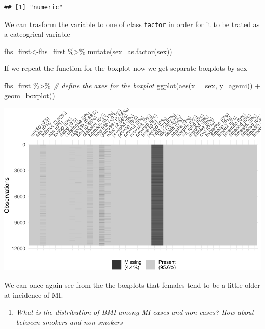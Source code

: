 \documentclass[
]{book}
\newenvironment{Shaded}{\begin{snugshade}}{\end{snugshade}}
\newcommand{\AttributeTok}[1]{\textcolor[rgb]{0.77,0.63,0.00}{#1}}
\newcommand{\CommentTok}[1]{\textcolor[rgb]{0.56,0.35,0.01}{\textit{#1}}}
\newcommand{\FunctionTok}[1]{\textcolor[rgb]{0.00,0.00,0.00}{#1}}
\newcommand{\NormalTok}[1]{#1}
\newcommand{\OtherTok}[1]{\textcolor[rgb]{0.56,0.35,0.01}{#1}}
\newcommand{\SpecialCharTok}[1]{\textcolor[rgb]{0.00,0.00,0.00}{#1}}
\providecommand{\tightlist}{%
  \setlength{\itemsep}{0pt}\setlength{\parskip}{0pt}}
\begin{document}
\begin{verbatim}
## [1] "numeric"
\end{verbatim}

We can trasform the variable to one of class \texttt{factor} in order for it to be trated as a cateogrical variable

\begin{Shaded}
\begin{Highlighting}[]
\NormalTok{fhs\_first}\OtherTok{\textless{}{-}}\NormalTok{fhs\_first }\SpecialCharTok{\%\textgreater{}\%} 
\FunctionTok{mutate}\NormalTok{(}\AttributeTok{sex=}\FunctionTok{as.factor}\NormalTok{(sex))}
\end{Highlighting}
\end{Shaded}

If we repeat the function for the boxplot now we get separate boxplots by sex

\begin{Shaded}
\begin{Highlighting}[]
\NormalTok{fhs\_first }\SpecialCharTok{\%\textgreater{}\%} 
  \CommentTok{\# define the axes for the boxplot}
  \FunctionTok{ggplot}\NormalTok{(}\FunctionTok{aes}\NormalTok{(}\AttributeTok{x =}\NormalTok{ sex, }\AttributeTok{y=}\NormalTok{agemi)) }\SpecialCharTok{+} 
  \FunctionTok{geom\_boxplot}\NormalTok{()}
\end{Highlighting}
\end{Shaded}

\includegraphics{adv_epi_analysis_files/figure-latex/unnamed-chunk-96-1.pdf}

We can once again see from the the boxplots that females tend to be a little older at incidence of MI.

\begin{enumerate}
\def\labelenumi{\arabic{enumi}.}
\setcounter{enumi}{4}
\tightlist
\item
  \emph{What is the distribution of BMI among MI cases and non-cases? How about between smokers and non-smokers}
\end{enumerate}
\end{document}

